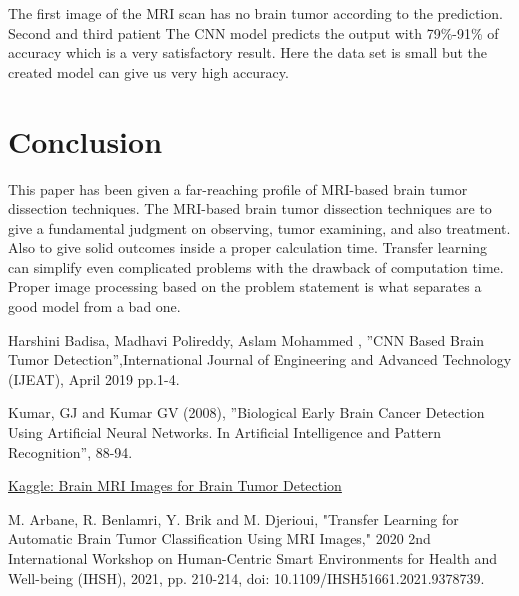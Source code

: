 \documentclass[conference]{IEEEtran}
\begin{document}
The first image of the MRI scan has no brain tumor according to the prediction. Second and third patient The CNN model predicts the output with 79\%-91\% of accuracy which is a very satisfactory result. Here the data set is small but the created model can give us very high accuracy. 
\section*{Conclusion}
This paper has been given a far-reaching profile of MRI-based brain tumor dissection techniques. The MRI-based brain tumor dissection techniques are to give a fundamental judgment on observing, tumor examining, and also treatment. Also to give solid outcomes inside a proper calculation time. Transfer learning can simplify even complicated problems with the drawback of computation time. Proper image processing based on the problem statement is what separates a good model from a bad one. 



\begin{thebibliography}{00}
 Harshini Badisa, Madhavi Polireddy, Aslam Mohammed , ''CNN Based Brain Tumor Detection'',International Journal of Engineering and Advanced Technology (IJEAT), April 2019 pp.1-4.

 Kumar, GJ and Kumar GV (2008), ''Biological Early Brain Cancer Detection Using Artificial Neural Networks. In Artificial Intelligence and Pattern Recognition'', 88-94.

\href{https://www.kaggle.com/navoneel/brain-mri-images-for-brain-tumor-detection}{Kaggle: Brain MRI Images for Brain Tumor Detection}

 M. Arbane, R. Benlamri, Y. Brik and M. Djerioui, "Transfer Learning for Automatic Brain Tumor Classification Using MRI Images," 2020 2nd International Workshop on Human-Centric Smart Environments for Health and Well-being (IHSH), 2021, pp. 210-214, doi: 10.1109/IHSH51661.2021.9378739.

\vspace{12pt}
\end{thebibliography}
\end{document}
